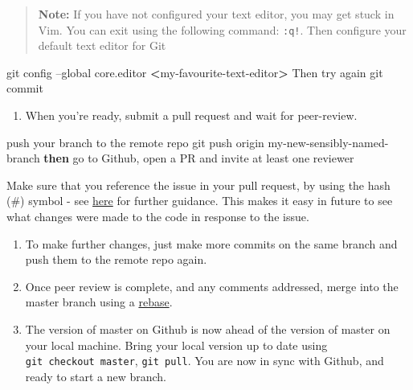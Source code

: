 \documentclass[]{book}
\newenvironment{Shaded}{\begin{snugshade}}{\end{snugshade}}
\newcommand{\ExtensionTok}[1]{#1}
\newcommand{\FunctionTok}[1]{\textcolor[rgb]{0.00,0.00,0.00}{#1}}
\newcommand{\KeywordTok}[1]{\textcolor[rgb]{0.13,0.29,0.53}{\textbf{#1}}}
\newcommand{\NormalTok}[1]{#1}
\newcommand{\OperatorTok}[1]{\textcolor[rgb]{0.81,0.36,0.00}{\textbf{#1}}}
\providecommand{\tightlist}{%
  \setlength{\itemsep}{0pt}\setlength{\parskip}{0pt}}
\begin{document}
\begin{quote}
\textbf{Note:}
If you have not configured your text editor, you may get stuck in Vim. You can exit using the following command: \texttt{:q!}. Then configure your default text editor for Git
\end{quote}

\begin{Shaded}
\begin{Highlighting}[]
\FunctionTok{git}\NormalTok{ config --global core.editor }\OperatorTok{<}\NormalTok{my-favourite-text-editor}\OperatorTok{>}
 \ExtensionTok{Then}\NormalTok{ try again}
\FunctionTok{git}\NormalTok{ commit}
\end{Highlighting}
\end{Shaded}

\begin{enumerate}
\def\labelenumi{\arabic{enumi}.}
\setcounter{enumi}{4}
\tightlist
\item
  When you're ready, submit a pull request and wait for peer-review.
\end{enumerate}

\begin{Shaded}
\begin{Highlighting}[]
\ExtensionTok{push}\NormalTok{ your branch to the remote repo}
\FunctionTok{git}\NormalTok{ push origin my-new-sensibly-named-branch}
\KeywordTok{then} \ExtensionTok{go}\NormalTok{ to Github, open a PR and invite at least one reviewer}
\end{Highlighting}
\end{Shaded}

Make sure that you reference the issue in your pull request, by using the hash (\#) symbol - see \href{https://help.github.com/articles/autolinked-references-and-urls/}{here} for further guidance. This makes it easy in future to see what changes were made to the code in response to the issue.

\begin{enumerate}
\def\labelenumi{\arabic{enumi}.}
\setcounter{enumi}{5}
\item
  To make further changes, just make more commits on the same branch and push them to the remote repo again.
\item
  Once peer review is complete, and any comments addressed, merge into the master branch using a \href{https://github.com/blog/2243-rebase-and-merge-pull-requests}{rebase}.
\item
  The version of master on Github is now ahead of the version of master on your local machine. Bring your local version up to date using \texttt{git\ checkout\ master}, \texttt{git\ pull}. You are now in sync with Github, and ready to start a new branch.
\end{enumerate}
\end{document}
